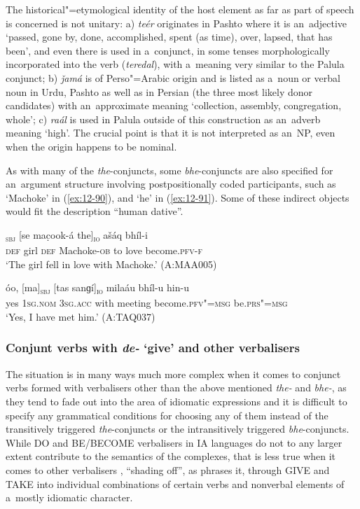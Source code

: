 The historical"=etymological identity of the host element as far as part of speech is concerned is not unitary: a) \textit{teér} originates in Pashto where it is an~adjective `passed, gone by, done, accomplished, spent (as time), over, lapsed, that has been', and even there is used in a~conjunct, in some tenses morphologically incorporated into the verb (\textit{teredal}), with a~meaning very similar to the Palula conjunct; b) \textit{ǰamá} is of Perso"=Arabic origin and is listed as a~noun or verbal noun in Urdu, Pashto as well as in Persian (the three most likely donor candidates) with an~approximate meaning `collection, assembly, congregation, whole'; c) \textit{raál} is used in Palula outside of this construction as an~adverb meaning `high'. The crucial point is that it is not interpreted as an~NP, even when the origin happens to be nominal. 


As with many of the \textit{the}-conjuncts, some \textit{bhe}-conjuncts are also specified for an~argument structure involving postpositionally coded participants, such as `Machoke' in (\ref{ex:12-90}), and `he' in (\ref{ex:12-91}). Some of these indirect objects would fit the description ``human dative''. 

\begin{exe}
\ex
\label{ex:12-90}
\gll [se phaí]\textsubscript{\textsc{sbj}} [se mac̣ook-á the]\textsubscript{\textsc{io}} ašáq bhíl-i \\
\textsc{def} girl \textsc{def} Machoke-\textsc{ob} to love  become.\textsc{pfv-f} \\
\glt `The girl fell in love with Machoke.' (A:MAA005)
\end{exe}
\begin{exe}
\ex
\label{ex:12-91}
\gll óo, [ma]\textsubscript{\textsc{sbj}} [tas sanɡí]\textsubscript{\textsc{io}} milaáu bhíl-u hin-u \\
yes \textsc{1sg.nom} \textsc{3sg.acc} with meeting become.\textsc{pfv"=msg}  be.\textsc{prs"=msg} \\
\glt `Yes, I have met him.' (A:TAQ037)
\end{exe}

\subsubsection*{Conjunt verbs with \textit{de-} `give' and other verbalisers}

The situation is in many ways much more complex when it comes to conjunct verbs formed with
verbalisers other than the above mentioned \textit{the-} and \textit{bhe-}, as they tend to fade out
into the area of idiomatic expressions and it is difficult to specify any grammatical conditions for
choosing any of them instead of the transitively triggered \textit{the}-conjuncts or the
intransitively triggered \textit{bhe}-conjuncts. While DO and BE/BECOME verbalisers in IA
languages do not to any larger extent contribute to the semantics of the complexes, that is less
true when it comes to other verbalisers \citep[78--79]{gambhir1993}, ``shading off'', as
\citet[157]{masica1993} phrases it, through GIVE and TAKE into individual combinations of certain
verbs and nonverbal elements of a~mostly idiomatic character.




